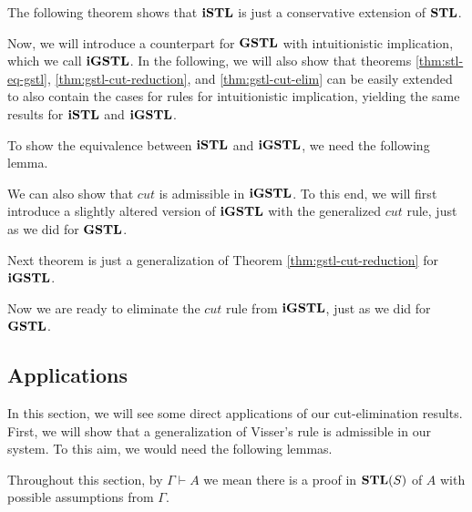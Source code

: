 \documentclass[10pt,a4paper]{amsart}
\begin{document}


The following theorem shows that $\mathbf{iSTL}$ is just a conservative extension of $\mathbf{STL}$.



Now, we will introduce a counterpart for $\mathbf{GSTL}$ with intuitionistic implication, which we call $\mathbf{iGSTL}$. In the following, we will also show that theorems \ref{thm:stl-eq-gstl}, \ref{thm:gstl-cut-reduction}, and \ref{thm:gstl-cut-elim} can be easily extended to also contain the cases for rules for intuitionistic implication, yielding the same results for $\mathbf{iSTL}$ and $\mathbf{iGSTL}$.



To show the equivalence between $\mathbf{iSTL}$ and $\mathbf{iGSTL}$, we need the following lemma.





We can also show that $cut$ is admissible in $\mathbf{iGSTL}$. To this end, we will first introduce a slightly altered version of $\mathbf{iGSTL}$ with the generalized $cut$ rule, just as we did for $\mathbf{GSTL}$.







Next theorem is just a generalization of Theorem \ref{thm:gstl-cut-reduction} for $\mathbf{iGSTL}$.



Now we are ready to eliminate the $cut$ rule from $\mathbf{iGSTL}$, just as we did for $\mathbf{GSTL}$.



\subsection{Applications}
In this section, we will see some direct applications of our cut-elimination results. First, we will show that a generalization of Visser's rule is admissible in our system. To this aim, we would need the following lemmas.

Throughout this section, by $\Gamma \vdash A$ we mean there is a proof in $\mathbf{STL}(S)$ of $A$ with possible assumptions from $\Gamma$.






\end{document}
